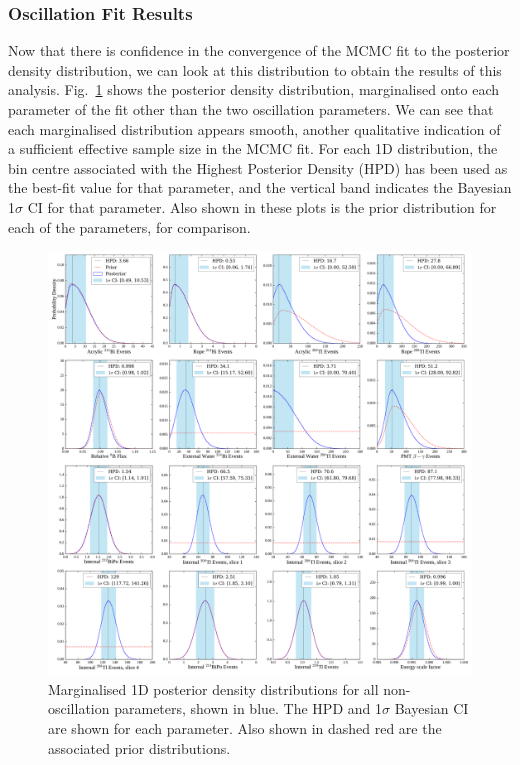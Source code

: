 \subsubsection{Oscillation Fit Results}
Now that there is confidence in the convergence of the MCMC fit to the posterior density distribution, we can look at this distribution to obtain the results of this analysis. Fig.~\ref{fig:nuisance_params_marged} shows the posterior density distribution, marginalised onto each parameter of the fit other than the two oscillation parameters. We can see that each marginalised distribution appears smooth, another qualitative indication of a sufficient effective sample size in the MCMC fit. For each 1D distribution, the bin centre associated with the Highest Posterior Density (HPD) has been used as the best-fit value for that parameter, and the vertical band indicates the Bayesian 1$\sigma$ CI for that parameter. Also shown in these plots is the prior distribution for each of the parameters, for comparison.

\begin{figure}
    \centering
    \includegraphics[width=\textwidth]{6_SolarAnalysis/images/posterior_densities_plot_no_osc.pdf}
    \caption[Marginalised 1D posterior density distributions for all non-oscillation parameters.]
    {Marginalised 1D posterior density distributions for all non-oscillation parameters, shown in blue. The HPD and 1$\sigma$ Bayesian CI are shown for each parameter. Also shown in dashed red are the associated prior distributions.}
    \label{fig:nuisance_params_marged}
\end{figure}

